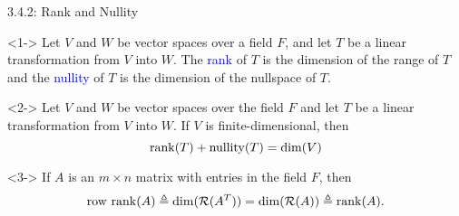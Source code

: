 \documentclass[10pt,letterpaper,english]{beamer}
\begin{document}
\begin{frame}{3.4.2: Rank and Nullity}

\begin{definition}<1->
Let $V$ and $W$ be vector spaces over a field $F$, and let $T$ be a linear transformation from $V$ into $W$.
The \textcolor{blue}{rank} of $T$ is the dimension of the range of $T$ and the \textcolor{blue}{nullity} of $T$ is the dimension of the nullspace of $T$.
\end{definition}

\vspace{2mm}

\begin{theorem}<2->
Let $V$ and $W$ be vector spaces over the field $F$ and let $T$ be a linear transformation from $V$ into $W$.
If $V$ is finite-dimensional, then
\begin{equation*}
\mathrm{rank} (T) + \mathrm{nullity} (T) = \dim (V)
\end{equation*}
\end{theorem}


\vspace{2mm}


\begin{theorem}<3->
If $A$ is an $m \times n$ matrix with entries in the field $F$, then
\begin{equation*}
\mathrm{row~rank} (A) \triangleq \dim( \mathcal{R}(A^T)) =  \dim( \mathcal{R}(A)) \triangleq \mathrm{rank} (A).
\end{equation*}
\end{theorem}


\end{frame}
\end{document}
